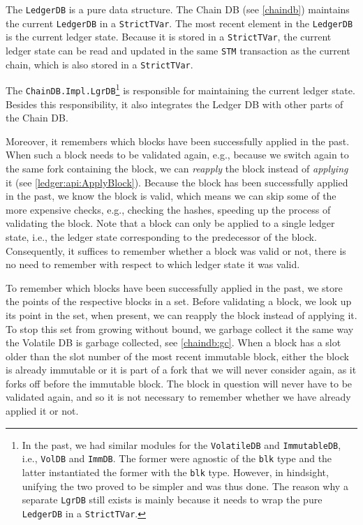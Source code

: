 The \lstinline!LedgerDB! is a pure data structure. The Chain DB (see
\cref{chaindb}) maintains the current \lstinline!LedgerDB! in a
\lstinline!StrictTVar!. The most recent element in the \lstinline!LedgerDB! is
the current ledger state. Because it is stored in a \lstinline!StrictTVar!, the
current ledger state can be read and updated in the same \lstinline!STM!
transaction as the current chain, which is also stored in a
\lstinline!StrictTVar!.

The \lstinline!ChainDB.Impl.LgrDB!\footnote{In the past, we had similar modules
for the \lstinline!VolatileDB! and \lstinline!ImmutableDB!, i.e.,
\lstinline!VolDB! and \lstinline!ImmDB!. The former were agnostic of the
\lstinline!blk! type and the latter instantiated the former with the
\lstinline!blk! type. However, in hindsight, unifying the two proved to be
simpler and was thus done. The reason why a separate \lstinline!LgrDB! still
exists is mainly because it needs to wrap the pure \lstinline!LedgerDB! in a
\lstinline!StrictTVar!.} is responsible for maintaining the current ledger
state. Besides this responsibility, it also integrates the Ledger DB with other
parts of the Chain DB.

Moreover, it remembers which blocks have been successfully applied in the past.
When such a block needs to be validated again, e.g., because we switch again to
the same fork containing the block, we can \emph{reapply} the block instead of
\emph{applying} it (see \cref{ledger:api:ApplyBlock}). Because the block has
been successfully applied in the past, we know the block is valid, which means
we can skip some of the more expensive checks, e.g., checking the hashes,
speeding up the process of validating the block. Note that a block can only be
applied to a single ledger state, i.e., the ledger state corresponding to the
predecessor of the block. Consequently, it suffices to remember whether a block
was valid or not, there is no need to remember with respect to which ledger
state it was valid.

To remember which blocks have been successfully applied in the past, we store
the points of the respective blocks in a set. Before validating a block, we look
up its point in the set, when present, we can reapply the block instead of
applying it. To stop this set from growing without bound, we garbage collect it
the same way the Volatile DB is garbage collected, see \cref{chaindb:gc}. When a
block has a slot older than the slot number of the most recent immutable block,
either the block is already immutable or it is part of a fork that we will never
consider again, as it forks off before the immutable block. The block in question will never have to be validated again, and
so it is not necessary to remember whether we have already applied it or not.

